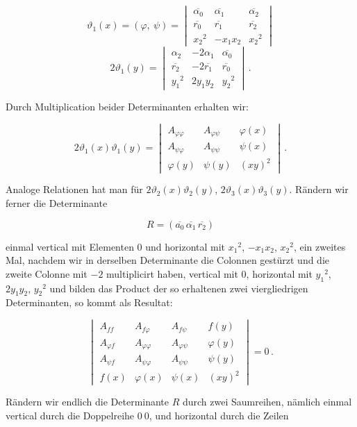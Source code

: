\[
\vartheta_1(x) = (\varphi,\ \psi) =
\begin{vmatrix}
\overline{\alpha_0} & \overline{\alpha_1} & \overline{\alpha_2} \\
\overline{r_0} & \overline{r_1} & \overline{r_2} \\
x_2{}^2 & -x_1x_2 & x_2{}^2
\end{vmatrix}
\]
\[
2\vartheta_1(y) =
\begin{vmatrix}
\alpha_2 & -2\alpha_1 & \overline{\alpha_0} \\
\overline{r_2} & -2\overline{r_1} & \overline{r_0} \\
y_1{}^2 & 2y_1y_2 & y_2{}^2
\end{vmatrix}\,.
\]

Durch Multiplication beider Determinanten erhalten wir:

\[
2\vartheta_1(x)\vartheta_1(y) =
\begin{vmatrix}
A_{\varphi\varphi} & A_{\varphi\psi} & \varphi(x) \\
A_{\psi\varphi} & A_{\psi\psi} & \psi(x) \\
\varphi(y) & \psi(y) & (xy)^2
\end{vmatrix}\,. \tag{V}
\]

Analoge Relationen hat man f\"ur $2\vartheta_2(x)\vartheta_2(y)$, $2\vartheta_3(x)\vartheta_3(y)$. R\"andern wir ferner die Determinante

\[
R = (\overline{a_0}\,\overline{\alpha_1}\,\overline{r_2})
\]

einmal vertical mit Elementen $0$ und horizontal mit $x_1{}^2$, $-x_1x_2$, $x_2{}^2$, ein zweites Mal, nachdem wir in derselben Determinante die Colonnen gest\"urzt und die zweite Colonne mit $-2$ multiplicirt haben, vertical mit $0$, horizontal mit $y_1{}^2$, $2y_1y_2$, $y_2{}^2$ und bilden das Product der so erhaltenen zwei viergliedrigen Determinanten, so kommt als Resultat:

\[
\begin{vmatrix}
A_{ff} & A_{f\varphi} & A_{f\psi} & f(y) \\
A_{\varphi f} & A_{\varphi\varphi} & A_{\varphi\psi} & \varphi(y) \\
A_{\psi f} & A_{\psi\varphi} & A_{\psi\psi} & \psi(y) \\
f(x) & \varphi(x) & \psi(x) & (xy)^2
\end{vmatrix} = 0\,. \tag{VI}
\]

R\"andern wir endlich die Determinante $R$ durch zwei Saumreihen, n\"amlich einmal vertical durch die Doppelreihe $0\ 0$, und horizontal durch die Zeilen

